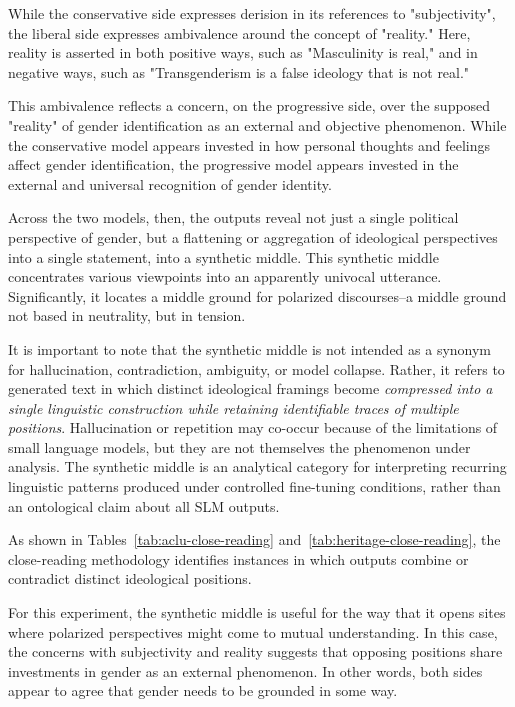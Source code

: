 \documentclass[anonymous,review]{acmart}
\begin{document}
While the conservative side expresses derision in its references to "subjectivity", the liberal side expresses ambivalence around the concept of "reality." Here, reality is asserted in both positive ways, such as "Masculinity is real," and in negative ways, such as "Transgenderism is a false ideology that is not real."

This ambivalence reflects a concern, on the progressive side, over the supposed "reality" of gender identification as an external and objective phenomenon. While the conservative model appears invested in how personal thoughts and feelings affect gender identification, the progressive model appears invested in the external and universal recognition of gender identity.

Across the two models, then, the outputs reveal not just a single political perspective of gender, but a flattening or aggregation of ideological perspectives into a single statement, into a synthetic middle. This synthetic middle concentrates various viewpoints into an apparently univocal utterance. Significantly, it locates a middle ground for polarized discourses--a middle ground not based in neutrality, but in tension.

It is important to note that the synthetic middle is not intended as a synonym for hallucination, contradiction, ambiguity, or model collapse. Rather, it refers to generated text in which distinct ideological framings become \textit{compressed into a single linguistic construction while retaining identifiable traces of multiple positions}. Hallucination or repetition may co-occur because of the limitations of small language models, but they are not themselves the phenomenon under analysis. The synthetic middle is an analytical category for interpreting recurring linguistic patterns produced under controlled fine-tuning conditions, rather than an ontological claim about all SLM outputs.

As shown in Tables~\ref{tab:aclu-close-reading} and~\ref{tab:heritage-close-reading}, the close-reading methodology identifies instances in which outputs combine or contradict distinct ideological positions.

For this experiment, the synthetic middle is useful for the way that it opens sites where polarized perspectives might come to mutual understanding. In this case, the concerns with subjectivity and reality suggests that opposing positions share investments in gender as an external phenomenon. In other words, both sides appear to agree that gender needs to be grounded in some way.
\end{document}
